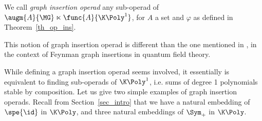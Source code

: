 \begin{defi}
    We call {\em graph insertion operad} any sub-operad of $\augm{A}{\MG}\ltimes\func{A}{\K\Poly^1}$,
    for $A$ a set and $\varphi$ as defined in Theorem~\ref{th_op_ins}.
\end{defi}

\begin{rema}
    This notion of graph insertion operad is different than the one mentioned in \cite{Kreimer:2000ja}, in 
    the context of Feynman graph insertions in quantum field theory.
\end{rema}


While defining a graph insertion operad seems involved, it essentially is equivalent to finding sub-operads of $\K\Poly^1$,
i.e. sums of degree 1 polynomials stable by composition.
Let us give two simple examples of graph insertion operads. Recall from 
Section~\ref{sec_intro} that we have a natural embedding of $\spe{\id}$ in $\K\Poly$, and three natural 
embeddings of $\Sym_+$ in $\K\Poly$.

